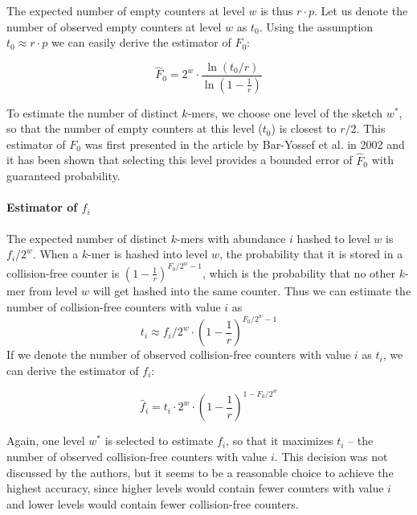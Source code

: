The expected number of empty counters at level $w$ is thus $r \cdot p$. Let us denote the
number of observed empty counters at level $w$ as $t_0$. Using the assumption
$t_0 \approx r \cdot p$ we can easily derive the estimator of $F_0$:

\begin{equation} \label{eq:hatF0}
\hat F_0 = 2^w \cdot \frac{\ln(t_0/r)}{\ln\left(1 - \frac{1}{r}\right)}
\end{equation}

To estimate the number of distinct $k$-mers, we choose one level of the sketch
$w^*$, so that the number of empty counters at this level ($t_0$) is closest to $r/2$.
This estimator of $F_0$ was first presented in the article by Bar-Yossef et al. in 2002
\cite{Bar-Yossef2002} and it has been shown that selecting this level provides a bounded 
error of $\hat F_0$ with guaranteed probability.

\paragraph{Estimator of $f_i$}
The expected number of distinct $k$-mers with abundance $i$ hashed to level $w$ is $f_i / 2^w$.
When a $k$-mer is hashed into level $w$, the probability that it is stored in a collision-free
counter is $(1 - \frac{1}{r})^{F_0/2^w - 1}$, which is the probability that no other $k$-mer 
from level $w$ will get hashed into the same counter. Thus we can estimate the number of
collision-free counters with value $i$ as 
\begin{equation} \label{eq:ti}
t_i \approx f_i / 2^w \cdot \left(1 - \frac{1}{r}\right)^{F_0/2^w - 1}
\end{equation}
If we denote the number of observed collision-free counters with value $i$ as $t_i$,
we can derive the estimator of $f_i$:

\begin{equation} \label{eq:hatfi}
\hat f_i = t_i \cdot 2^w \cdot \left(1 - \frac{1}{r}\right)^{1 - F_0/2^w}
\end{equation}


Again, one level $w^*$ is selected to estimate $f_i$, so that it maximizes $t_i$ -- the number 
of observed collision-free counters with value $i$. This decision was not discussed by the authors,
but it seems to be a reasonable choice to achieve the highest accuracy, since higher levels
would contain fewer counters with value $i$ and lower levels would contain fewer
collision-free counters.

